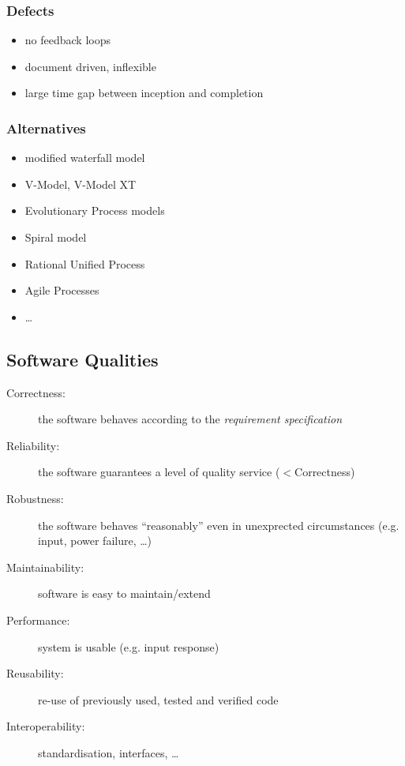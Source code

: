 \documentclass[a4paper, 10pt]{article}
\begin{document}
\subsubsection*{Defects}
\begin{itemize}
	\item no feedback loops
	\item document driven, inflexible
	\item large time gap between inception and completion
\end{itemize}

\subsubsection*{Alternatives}
\begin{itemize}
	\item modified waterfall model
	\item V-Model, V-Model XT
	\item Evolutionary Process models
	\item Spiral model
	\item Rational Unified Process
	\item Agile Processes
	\item \dots
\end{itemize}

\subsection*{Software Qualities}
\begin{description}
	\item[Correctness:] the software behaves according to the \emph{requirement specification}
	\item[Reliability:] the software guarantees a level of quality service ($<$Correctness)
	\item[Robustness:] the software behaves ``reasonably'' even in unexprected circumstances (e.g. input, power failure, \dots)
	\item[Maintainability:] software is easy to maintain/extend
	\item[Performance:] system is usable (e.g. input response)
	\item[Reusability:] re-use of previously used, tested and verified code
	\item[Interoperability:] standardisation, interfaces, \dots
\end{description}
\end{document}
